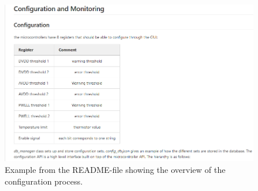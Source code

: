 \documentclass[main.tex]{subfiles}
\begin{document}
\begin{figure}[!ht]
    \centering
    \includegraphics[width=18cm]{images/README_example.png}
    \caption{Example from the README-file showing the overview of the configuration process.}
    \label{fig: readme}
\end{figure}
\FloatBarrier
\end{document}
